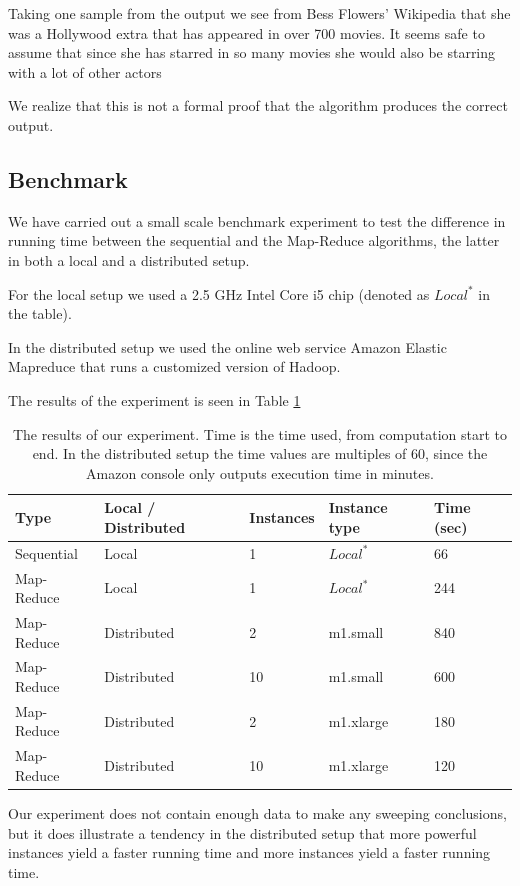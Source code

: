 \documentclass[a4paper,11pt]{article}
\begin{document}
Taking one sample from the output we see from Bess Flowers' Wikipedia that she was a Hollywood extra that has appeared in over 700 movies. It seems safe to assume that since she has starred in so many movies she would also be starring with a lot of other actors

We realize that this is not a formal proof that the algorithm produces the correct output.

\subsection{Benchmark}
We have carried out a small scale benchmark experiment to test the difference in running time between the sequential and the Map-Reduce algorithms, the latter in both a local and a distributed setup. 

For the local setup we used a 2.5 GHz Intel Core i5 chip (denoted as $Local^*$ in the table). 

In the distributed setup we used the online web service Amazon Elastic Mapreduce that runs a customized version of Hadoop. 

The results of the experiment is seen in Table \ref{tab:benchmark}

\begin{table}[h!]

\begin{center}
    \begin{tabular}{|l|l|l|l|l|}
    \hline
    Type       & Local / Distributed & Instances & Instance type                     & Time (sec) \\ \hline
    Sequential & Local               & 1         & $Local^*$ & 66                 \\ \hline
    Map-Reduce & Local               & 1         & $Local^*$ & 244                 \\ \hline
    Map-Reduce & Distributed         & 2         & m1.small                          & 840                 \\ \hline
    Map-Reduce & Distributed         & 10        & m1.small                          & 600                 \\ \hline
    Map-Reduce & Distributed         & 2         & m1.xlarge                         & 180                 \\ \hline
    Map-Reduce & Distributed         & 10        & m1.xlarge                         & 120                 \\ \hline
    \end{tabular}
    \end{center}
    \caption{The results of our experiment. Time is the time used, from computation start to end. In the distributed setup the time values are multiples of 60, since the Amazon console only outputs execution time in minutes.}\label{tab:benchmark}
\end{table}
Our experiment does not contain enough data to make any sweeping conclusions, but it does illustrate a tendency in the distributed setup that more powerful instances yield a faster running time and more instances yield a faster running time. 
\end{document}
